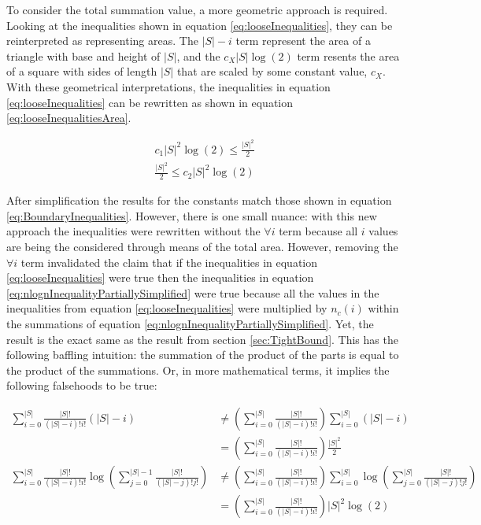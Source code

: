 \documentclass{article}
\begin{document}
To consider the total summation value, a more geometric approach is required. Looking at the inequalities shown in equation \ref{eq:looseInequalities}, they can be reinterpreted as representing areas. The $|S|-i$ term represent the area of a triangle with base and height of $|S|$, and the $c_X|S|\log(2)$ term resents the area of a square with sides of length $|S|$ that are scaled by some constant value, $c_X$. With these geometrical interpretations, the inequalities in equation \ref{eq:looseInequalities} can be rewritten as shown in equation \ref{eq:looseInequalitiesArea}.

\begin{equation}
	\begin{split}
		c_1|S|^2\log(2)\le \frac{|S|^2}{2} \\
		\frac{|S|^2}{2}\le c_2|S|^2\log(2)
	\end{split}
	\label{eq:looseInequalitiesArea}
\end{equation}

After simplification the results for the constants match those shown in equation \ref{eq:BoundaryInequalities}. However, there is one small nuance: with this new approach the inequalities were rewritten without the $\forall i$ term because all $i$ values are being the considered through means of the total area. However, removing the $\forall i$ term invalidated the claim that if the inequalities in equation \ref{eq:looseInequalities} were true then the inequalities in equation \ref{eq:nlognInequalityPartiallySimplified} were true because all the values in the inequalities from equation \ref{eq:looseInequalities} were multiplied by $n_c(i)$ within the summations of equation \ref{eq:nlognInequalityPartiallySimplified}. Yet, the result is the exact same as the result from section \ref{sec:TightBound}. This has the following baffling intuition: the summation of the product of the parts is equal to the product of the summations. Or, in more mathematical terms, it implies the following falsehoods to be true:

\begin{equation}
	\begin{split}
		\sum_{i=0}^{|S|}\frac{|S|!}{(|S|-i)!i!}\left(|S| -i\right)
		&\ne
		\left( \sum_{i=0}^{|S|}\frac{|S|!}{(|S|-i)!i!} \right)\sum_{i=0}^{|S|}\left(|S| -i\right)
		\\
		&=
		\left( \sum_{i=0}^{|S|}\frac{|S|!}{(|S|-i)!i!} \right)\frac{|S|^2}{2}
		\\
		\sum_{i=0}^{|S|}\frac{|S|!}{(|S|-i)!i!}
        \log \left( \sum_{j=0}^{|S|-1}\frac{|S|!}{(|S|-j)!j!} \right)
        &\ne
        \left( \sum_{i=0}^{|S|}\frac{|S|!}{(|S|-i)!i!} \right)
        \sum_{i=0}^{|S|}
        \log \left( \sum_{j=0}^{|S|}\frac{|S|!}{(|S|-j)!j!} \right)
        \\
        &=
        \left( \sum_{i=0}^{|S|}\frac{|S|!}{(|S|-i)!i!} \right)
        |S|^2\log(2)
	\end{split}
\end{equation}
\end{document}
